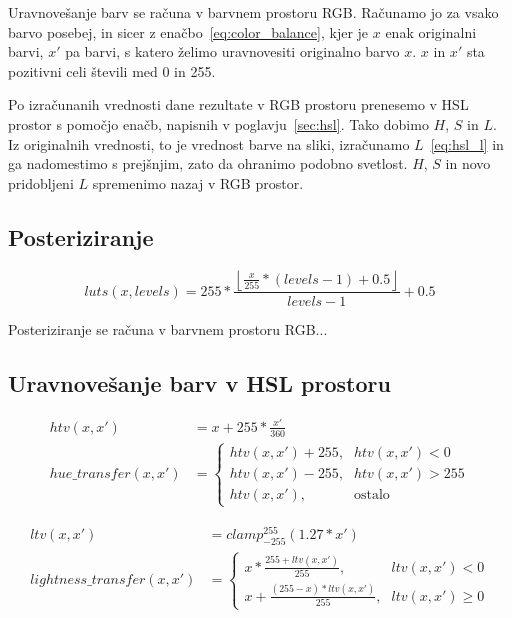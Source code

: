 Uravnovešanje barv se računa v barvnem prostoru RGB. Računamo jo za vsako
barvo posebej, in sicer z enačbo~\eqref{eq:color_balance}, kjer je $x$ enak
originalni barvi, $x'$ pa barvi, s katero želimo uravnovesiti originalno barvo
$x$. $x$ in $x'$ sta pozitivni celi števili med 0 in 255.

Po izračunanih vrednosti dane rezultate v RGB prostoru prenesemo v HSL prostor
s pomočjo enačb, napisnih v poglavju~\ref{sec:hsl}. Tako dobimo $H$, $S$ in
$L$. Iz originalnih vrednosti, to je vrednost barve na sliki, izračunamo
$L$~\ref{eq:hsl_l} in ga nadomestimo s prejšnjim, zato da ohranimo podobno
svetlost. $H$, $S$ in novo pridobljeni $L$ spremenimo nazaj v RGB prostor.

\subsection{Posteriziranje}

\begin{equation}
luts(x, levels) = 255 * \frac{\left \lfloor{\frac{x}{255} * (levels - 1) + 0.5}\right \rfloor}{levels - 1} + 0.5
\end{equation}

Posteriziranje se računa v barvnem prostoru RGB...

\subsection{Uravnovešanje barv v HSL prostoru}

\begin{align}
htv(x, x') &= x + 255 * \frac{x'}{360} \nonumber \\
hue\_transfer(x, x') &=
\begin{cases}
    htv(x, x') + 255 \text{,}& htv(x, x') < 0 \\
    htv(x, x') - 255 \text{,}& htv(x, x') > 255 \\
    htv(x, x') \text{,}& \text{ostalo}
\end{cases}
\end{align}

\begin{align}
ltv(x, x') &= clamp_{-255}^{255}(1.27 * x') \nonumber \\
lightness\_transfer(x, x') &=
\begin{cases}
    x * \frac{255 + ltv(x, x')}{255} \text{,}& ltv(x, x') < 0 \\
    x + \frac{(255 - x) * ltv(x, x')}{255} \text{,}& ltv(x, x') \geq 0
\end{cases}
\end{align}

